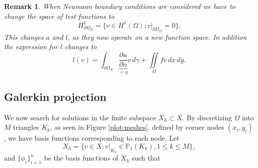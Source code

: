 \documentclass[5pt,a4paper,english]{elsarticle}%
\newcommand{\restr}[2]{\ensuremath{\left.#1\right|_{#2}}}
\newtheorem*{remark}{Remark}
\begin{document}
\begin{remark}
    When Neumann boundary conditions are considered we have to change the space of test functions to 
    \begin{equation}
        H^1_{\partial \Omega_D } = \{v \in H^1(\Omega):\restr{v}{\partial \Omega_D }=0 \}.
    \end{equation}
    This changes $a$ and $l$, as they now operate on a new function space. In addition the expression for $l$ changes to
    \begin{equation}
        l(v) = \int_{\partial \Omega_N} \underbrace{ \frac{\partial u}{\partial n}}_{=g} v \, d\gamma + \iint\limits_{\Omega} f v  \, dx \, dy.
        \label{neumann-conditions}
    \end{equation}
\end{remark}

\subsection{Galerkin projection}

We now search for solutions in the finite subspace $X_h \subset X$. 
By discretizing $\Omega$ into $M$ triangles $K_k$, as seen in Figure \ref{plot-meshes}, defined by corner nodes $(x_i,y_i)$, we have basis functions corresponding to each node.
Let 
\begin{equation*}
X_h = \{ v \in X : v|_{K_k} \in \mathbb{P}_1 (K_k),1\leq k\leq M \},
\end{equation*}
and $\{\phi_i\}_{i=1}^n$ be the basis functions of $X_h$ such that
\end{document}

